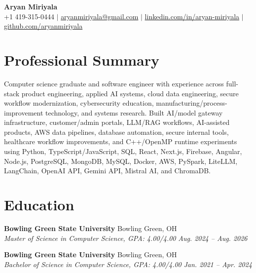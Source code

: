 \documentclass[letterpaper,10pt]{article}
\newcommand{\resumeSubheading}[4]{
  \vspace{2pt}
  \textbf{#1} \hfill #2\\
  \textit{#3} \hfill \textit{#4}
}
\begin{document}
\begin{center}
  {\LARGE \textbf{Aryan Miriyala}}\\
  \vspace{2pt}
  +1 419-315-0444 $|$
  \href{mailto:aryanmiriyala@gmail.com}{aryanmiriyala@gmail.com} $|$
  \href{https://www.linkedin.com/in/aryan-miriyala-7788a21b6/}{linkedin.com/in/aryan-miriyala} $|$
  \href{https://github.com/aryanmiriyala}{github.com/aryanmiriyala}
\end{center}

\section{Professional Summary}
Computer science graduate and software engineer with experience across full-stack product engineering, applied AI systems, cloud data engineering, secure workflow modernization, cybersecurity education, manufacturing/process-improvement technology, and systems research. Built AI/model gateway infrastructure, customer/admin portals, LLM/RAG workflows, AI-assisted products, AWS data pipelines, database automation, secure internal tools, healthcare workflow improvements, and C++/OpenMP runtime experiments using Python, TypeScript/JavaScript, SQL, React, Next.js, Firebase, Angular, Node.js, PostgreSQL, MongoDB, MySQL, Docker, AWS, PySpark, LiteLLM, LangChain, OpenAI API, Gemini API, Mistral AI, and ChromaDB.

\section{Education}
\resumeSubheading
{Bowling Green State University}{Bowling Green, OH}
{Master of Science in Computer Science, GPA: 4.00/4.00}{Aug. 2024 -- Aug. 2026}

\resumeSubheading
{Bowling Green State University}{Bowling Green, OH}
{Bachelor of Science in Computer Science, GPA: 4.00/4.00}{Jan. 2021 -- Apr. 2024}
\end{document}
